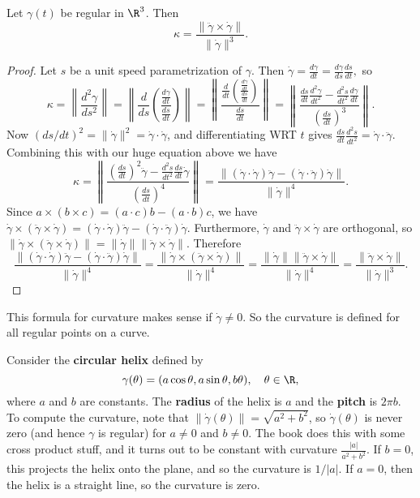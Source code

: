\begin{prop}
    Let $\gamma (t)$ be regular in $\R^3$. Then \[
    \kappa= \frac{\|\ddot \gamma \times \dot \gamma \|}{\|\dot \gamma \|^3}.
    \] 
\end{prop}
\begin{proof}
    Let $s$ be a unit speed parametrization of $\gamma $. Then $\dot \gamma = \frac{d\gamma }{dt}= \frac{d\gamma }{ds}\frac{ds}{dt},$ so \[
        \kappa= \left\| \frac{d^2 \gamma }{ds ^2} \right\|=\left\| \frac{d}{ds}\left( \frac{\frac{d\gamma }{dt}}{\frac{ds}{dt}} \right)  \right\|= \left\|\frac{\frac{d}{dt}\left( \frac{\frac{d\gamma }{dt}}{\frac{ds}{dt}} \right) }{\frac{ds}{dt}} \right\|= \left\| \frac{\frac{ds}{dt}\frac{d^2 \gamma }{dt^2}-\frac{d^2s}{dt^2}\frac{d\gamma }{dt}}{\left(\frac{ds}{dt}\right)^3} \right\|.
    \] Now $( ds /dt)^2= \|\dot\gamma \|^2=\dot \gamma \cdot \dot \gamma $, and differentiating WRT $t$ gives $\frac{ds}{dt}\frac{d^2 s}{dt^2}=\dot \gamma  \cdot  \ddot \gamma $. Combining this with our huge equation above we have \[
    \kappa= \left\| \frac{\left( \frac{ds}{dt} \right) ^2 \ddot \gamma - \frac{d^2 s}{dt^2}\frac{ds}{dt}\dot \gamma }{\left( \frac{ds}{dt} \right) ^4} \right\|= \frac{\|(\dot \gamma \cdot \dot \gamma )\ddot \gamma -(\dot \gamma \cdot \ddot\gamma )\dot\gamma \|}{\|\dot \gamma \|^4}.
\] Since $a \times (b \times c)=(a\cdot c)b-(a\cdot b)c$, we have $\dot \gamma \times (\ddot \gamma \times \dot \gamma )=(\dot \gamma \cdot \dot \gamma )\ddot\gamma -(\dot \gamma \cdot \ddot\gamma )\dot\gamma $. Furthermore, $\dot \gamma $ and $\ddot\gamma \times \dot\gamma $ are orthogonal, so $\|\dot\gamma \times (\ddot\gamma \times \dot\gamma )\|=\|\dot\gamma \|\|\ddot\gamma \times \dot\gamma \|$. Therefore \[
\frac{\|(\dot \gamma \cdot \dot \gamma )\ddot \gamma -(\dot \gamma \cdot \ddot\gamma )\dot\gamma \|}{\|\dot \gamma \|^4}= \frac{\|\dot\gamma \times (\ddot\gamma \times \dot\gamma )\|}{\|\dot\gamma \|^4}=\frac{\|\dot\gamma \|\|\ddot\gamma \times \dot\gamma \|}{\|\dot\gamma \|^4}= \frac{\|\ddot\gamma \times \dot\gamma \|}{\|\dot\gamma \|^3}.
\] 
\end{proof}
This formula for curvature makes sense if $\dot \gamma \neq 0$. So the curvature is defined for all regular points on a curve.

\begin{example}
    Consider the \textbf{circular helix} defined by \[
        \gamma (\theta)= (a \cos \theta, a \sin\theta,b\theta), \quad \theta\in \R, \] 
        where $a$ and $b$ are constants. The \textbf{radius} of the helix is $a$ and the \textbf{pitch} is $2\pi b$. To compute the curvature, note that $\|\dot\gamma (\theta)\|=\sqrt{a^2+b^2} $, so $\dot\gamma (\theta)$ is never zero (and hence $\gamma $ is regular) for $a\neq0$ and $b\neq 0$.  The book does this with some cross product stuff, and it turns out to be constant with curvature $\frac{|a|}{a^2+b^2}$. If $b=0$, this projects the helix onto the plane, and so the curvature is $1 /|a|$. If $a=0$, then the helix is a straight line, so the curvature is zero.
\end{example}

